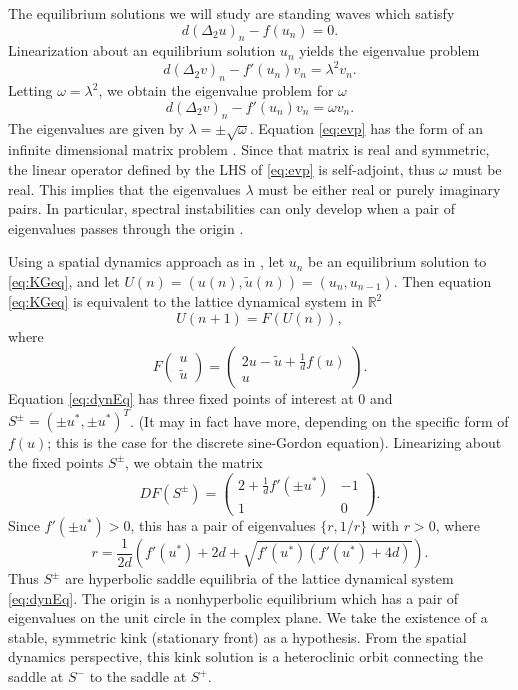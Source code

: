 \documentclass[12pt,reqno]{amsart}
\def\R{{\mathbb R}}
\begin{document}
The equilibrium solutions we will study are standing waves which satisfy 
\begin{equation}\label{eq:KGeq}
d (\Delta_2 u)_n - f(u_n) = 0.
\end{equation}
Linearization about an equilibrium solution $u_n$ yields the eigenvalue problem
\begin{equation}\label{eq:KGevp1}
d (\Delta_2 v)_n - f'(u_n)v_n = \lambda^2 v_n.
\end{equation}
Letting $\omega = \lambda^2$, we obtain the eigenvalue problem for $\omega$
\begin{equation}\label{eq:evp}
d (\Delta_2 v)_n - f'(u_n)v_n = \omega v_n.
\end{equation}
The eigenvalues are given by $\lambda = \pm \sqrt{\omega}$. Equation \cref{eq:evp} has the form of an infinite dimensional matrix problem \cite{Balmforth2000}. Since that matrix is real and symmetric, the linear operator defined by the LHS of \cref{eq:evp} is self-adjoint, thus $\omega$ must be real. This implies that the eigenvalues $\lambda$ must be either real or purely imaginary pairs. In particular, spectral instabilities can only develop when a pair of eigenvalues passes through the origin \cite{Balmforth2000}.

Using a spatial dynamics approach as in \cite{Parker2020}, let $u_n$ be an equilibrium solution to \cref{eq:KGeq}, and let $U(n) = (u(n), \tilde{u}(n)) = (u_n, u_{n-1})$. Then equation \cref{eq:KGeq} is equivalent to the lattice dynamical system in $\R^2$
\begin{equation}\label{eq:dynEq}
U(n+1) = F(U(n)),
\end{equation}
where
\[
F\begin{pmatrix}u \\ \tilde{u} \end{pmatrix} =
\begin{pmatrix}2u - \tilde{u} + \frac{1}{d}f(u) \\
u
\end{pmatrix}.
\]
Equation \cref{eq:dynEq} has three fixed points of interest at 0 and $S^\pm = (\pm u^*, \pm u^*)^T$. (It may in fact have more, depending on the specific form of $f(u)$; this is the case for the discrete sine-Gordon equation). Linearizing about the fixed points $S^\pm$, we obtain the matrix 
\[
D F(S^\pm)=
\begin{pmatrix}2 + \frac{1}{d}f'(\pm u^*) & -1 \\ 1 & 0
\end{pmatrix}.
\]
Since $f'(\pm u^*) > 0$, this has a pair of eigenvalues $\{ r, 1/r \}$ with $r > 0$, where
\begin{equation}\label{eq:r}
r = \frac{1}{2d}\left( f'(u^*) + 2d + \sqrt{f'(u^*)(f'(u^*) + 4d)} \right).
\end{equation}
Thus $S^\pm$ are hyperbolic saddle equilibria of the lattice dynamical system \cref{eq:dynEq}. The origin is a nonhyperbolic equilibrium which has a pair of eigenvalues on the unit circle in the complex plane. We take the existence of a stable, symmetric kink (stationary front) as a hypothesis. From the spatial dynamics perspective, this kink solution is a heteroclinic orbit connecting the saddle at $S^-$ to the saddle at $S^+$.
\end{document}
